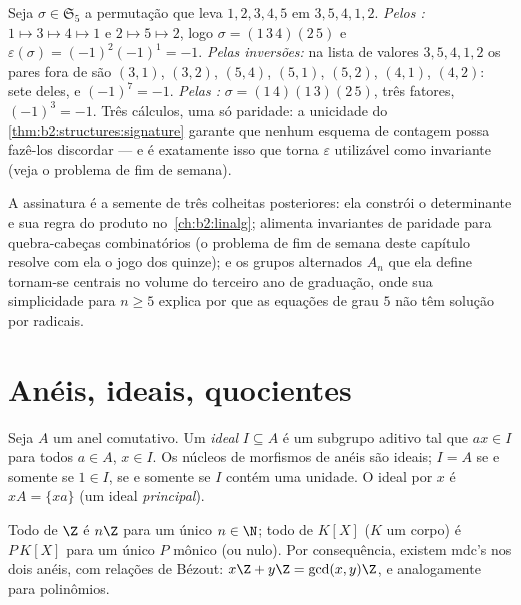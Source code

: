 \begin{example}\label{ex:b2:structures:threeroads}
Seja $\sigma \in \mathfrak{S}_5$ a permutação que leva $1, 2, 3, 4, 5$ em $3, 5, 4,
1, 2$. \emph{Pelos :} $1 \mapsto 3 \mapsto 4 \mapsto 1$ e $2
\mapsto 5 \mapsto 2$, logo $\sigma = (1\,3\,4)(2\,5)$ e
$\varepsilon(\sigma) = (-1)^{2}(-1)^{1} = -1$. \emph{Pelas
inversões:} na lista de valores $3, 5, 4, 1, 2$ os pares fora de 
são $(3,1)$, $(3,2)$, $(5,4)$, $(5,1)$, $(5,2)$, $(4,1)$,
$(4,2)$: sete deles, e $(-1)^7 = -1$. \emph{Pelas
:} $\sigma = (1\,4)(1\,3)(2\,5)$, três fatores,
$(-1)^3 = -1$. Três cálculos, uma só paridade: a unicidade do
\cref{thm:b2:structures:signature} garante que nenhum esquema de contagem
possa fazê-los discordar --- e é exatamente isso que torna
$\varepsilon$ utilizável como invariante (veja o problema de fim de semana).
\end{example}

\begin{remark}
A assinatura é a semente de três colheitas posteriores: ela constrói o
determinante e sua regra do produto no~\cref{ch:b2:linalg}; alimenta
invariantes de paridade para quebra-cabeças combinatórios (o problema de
fim de semana deste capítulo resolve com ela o jogo dos quinze); e os grupos
alternados $A_n$ que ela define tornam-se centrais no volume do terceiro ano de
graduação, onde sua simplicidade para $n \geq 5$ explica por que as equações de
grau $5$ não têm solução por radicais.
\end{remark}

\section{Anéis, ideais, quocientes}

\begin{definition}[Ideal]\label{def:b2:structures:ideal}
Seja $A$ um anel comutativo. Um \emph{ideal} $I
\subseteq A$ é um subgrupo aditivo tal que $a x \in I$ para todos
$a \in A$, $x \in I$. Os núcleos de morfismos de anéis são ideais; $I = A$
se e somente se $1 \in I$, se e somente se $I$ contém uma unidade. O ideal \emph{} por
$x$ é $xA = \{xa\}$ (um ideal \emph{principal}).
\end{definition}

\begin{theorem}[{Ideais de $\Z$ e de $K[X]$}]\label{thm:b2:structures:principal}
Todo  de $\Z$ é $n\Z$ para um único $n \in \N$; todo  de
$K[X]$ ($K$ um corpo) é $P\,K[X]$ para um único $P$ mônico (ou nulo).
Por consequência, existem mdc's nos dois anéis, com relações de Bézout: $x\Z +
y\Z = \gcd(x,y)\Z$, e analogamente para polinômios.
\end{theorem}

